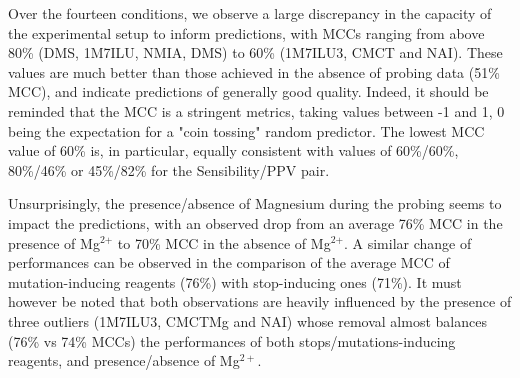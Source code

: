 \documentclass[a4,center,fleqn]{NAR}
\begin{document}
Over the fourteen conditions, we observe a large discrepancy in the capacity of the experimental setup to inform predictions, with MCCs ranging from above 80\% (DMS, 1M7ILU, NMIA, DMS) to 60\% (1M7ILU3, CMCT and NAI). These values are much better than those achieved in the absence of probing data (51\% MCC), and indicate predictions of generally good quality. Indeed, it should be reminded that the MCC is a stringent metrics, taking values between -1 and 1, 0 being the expectation for a "coin tossing" random predictor. The lowest MCC value of 60\% is, in particular, equally consistent with values of 60\%/60\%, 80\%/46\% or 45\%/82\% for the Sensibility/PPV pair.

Unsurprisingly, the presence/absence of Magnesium during the probing seems to impact the predictions, with an observed drop from an average 76\% MCC in the presence of Mg$^\text{2+}$ to 70\% MCC in the absence of Mg$^\text{2+}$. A similar change of performances can be observed in the comparison of the average MCC of mutation-inducing reagents (76\%) with stop-inducing ones (71\%). It must however be noted that both observations are heavily influenced by the presence of three outliers (1M7ILU3, CMCTMg and NAI) whose removal almost balances (76\% vs 74\% MCCs) the performances of both stops/mutations-inducing reagents, and presence/absence of Mg$^{2+}$.
\end{document}
